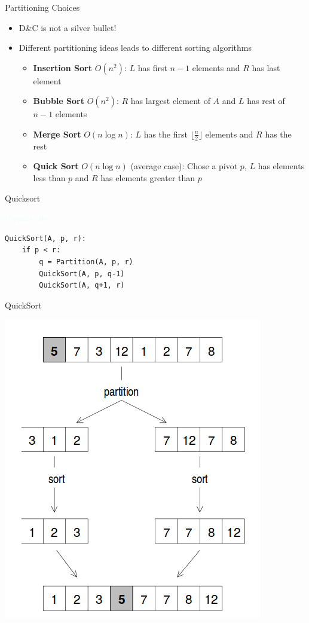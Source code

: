 \documentclass{beamer}
\newcommand{\tblue}[1]{{\Large {\textcolor{azure}{#1}}}}
\begin{document}
\begin{frame}{Partitioning Choices}
\begin{itemize}
\item D\&C is not a silver bullet!
\item Different partitioning ideas leads to different sorting algorithms
\begin{itemize}
    \item {\bf Insertion Sort} $O(n^2)$: $L$ has first $n-1$ elements and $R$ has last element 
    \item {\bf Bubble Sort} $O(n^2)$: $R$ has largest element of $A$ and $L$ has rest of $n-1$ elements
    \item {\bf Merge Sort} $O(n \log n)$: $L$ has the first $\lfloor \frac{n}{2} \rfloor$ elements and $R$ has the rest
    \item {\bf Quick Sort} $O(n \log n)$ (average case): Chose a pivot $p$, $L$ has elements less than $p$ and $R$ has elements greater than $p$
\end{itemize}
\end{itemize}
\end{frame}

\begin{frame}[fragile]{Quicksort}

\tblue{Pseudocode:}
\begin{verbatim}
QuickSort(A, p, r):
    if p < r:
        q = Partition(A, p, r)
        QuickSort(A, p, q-1)
        QuickSort(A, q+1, r)
\end{verbatim}
\end{frame}



\begin{frame}{QuickSort}
\begin{center}
    \includegraphics[scale=0.4]{quickSortHighLevelExample.png}
\end{center}
\end{frame}
\end{document}
